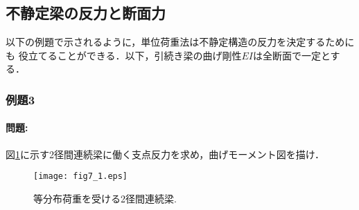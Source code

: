 ﻿\documentclass[10pt,a4j]{jarticle}
\begin{document}
\subsection{不静定梁の反力と断面力}
以下の例題で示されるように，単位荷重法は不静定構造の反力を決定するためにも
役立てることができる．以下，引続き梁の曲げ剛性$EI$は全断面で一定とする．
\subsubsection{例題3}
\paragraph{問題:}
図\ref{fig:fig7_1}に示す2径間連続梁に働く支点反力を求め，曲げモーメント図を描け．
\begin{figure}[h]
	\begin{center}
	\texttt{[image: fig7\_1.eps]} 
	\end{center}
	\caption{等分布荷重を受ける2径間連続梁.} 
	\label{fig:fig7_1}
\end{figure}
\end{document}
